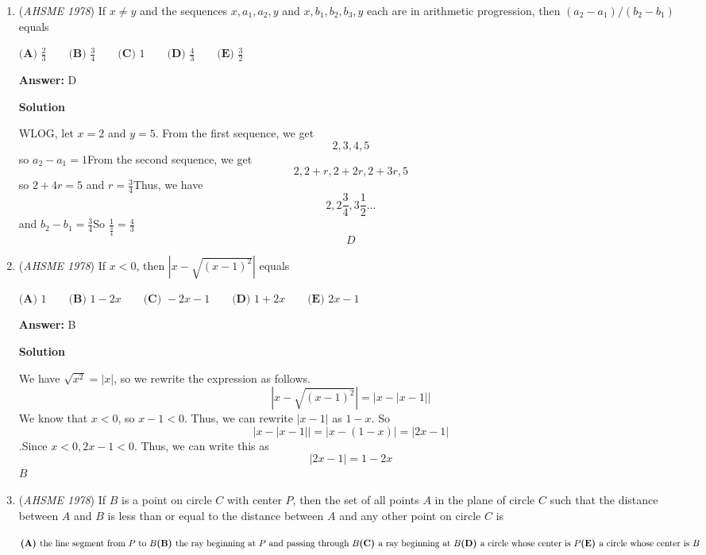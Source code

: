 \begin{enumerate}
	\item (\textit{AHSME 1978}) If $x\neq y$ and the sequences $x,a_1,a_2,y$ and $x,b_1,b_2,b_3,y$ each are in arithmetic progression, then $(a_2-a_1)/(b_2-b_1)$ equals


 $\textbf{(A) }\frac{2}{3}\qquad \textbf{(B) }\frac{3}{4}\qquad \textbf{(C) }1\qquad \textbf{(D) }\frac{4}{3}\qquad \textbf{(E) }\frac{3}{2}$

 \textbf{Answer: }D



\textbf{Solution}

WLOG, let $x =2$ and $y = 5$. From the first sequence, we get
 \[2, 3, 4, 5\] so $a_2 - a_1 = 1$From the second sequence, we get
 \[2, 2+r, 2+2r, 2+3r, 5\] so $2+4r = 5$ and $r = \frac{3}{4}$Thus, we have 
 \[2, 2 \frac{3}{4}, 3 \frac{1}{2} ...\] and $b_2 - b_1 = \frac{3}{4}$So $\frac{1}{\frac{3}{4}} = \frac{4}{3}$
 \[\boxed{D}\]



	\item (\textit{AHSME 1978}) If $x<0$, then $\left|x-\sqrt{(x-1)^2}\right|$ equals


 $\textbf{(A) }1\qquad \textbf{(B) }1-2x\qquad \textbf{(C) }-2x-1\qquad \textbf{(D) }1+2x\qquad  \textbf{(E) }2x-1$

 \textbf{Answer: }B



\textbf{Solution}

We have $\sqrt{x^2} = |x|$, so we rewrite the expression as follows.
 \[|x - \sqrt{(x-1)^2}| = |x - |x-1||\]We know that $x < 0$, so $x-1 < 0$. Thus, we can rewrite $|x-1|$ as $1-x$. So
 \[|x - |x-1|| = |x - (1-x)| = |2x - 1|\].Since $x< 0, 2x-1 < 0$. Thus, we can write this as
 \[|2x - 1| = 1- 2x\]$\boxed{B}$



	\item (\textit{AHSME 1978}) If $\mathit{B}$ is a point on circle $\mathit{C}$ with center $\mathit{P}$, then the set of all points $\mathit{A}$ in the plane of circle 
$\mathit{C}$ such that the distance between $\mathit{A}$ and $\mathit{B}$ is less than or equal to the distance between $\mathit{A}$ 
and any other point on circle $\mathit{C}$ is


 $\textbf{(A) }\text{the line segment from }P \text{ to }B\qquad\\ \textbf{(B) }\text{the ray beginning at }P \text{ and passing through }B\qquad\\ \textbf{(C) }\text{a ray beginning at }B\qquad\\ \textbf{(D) }\text{a circle whose center is }P\qquad\\ \textbf{(E) }\text{a circle whose center is }B$


\end{enumerate}
